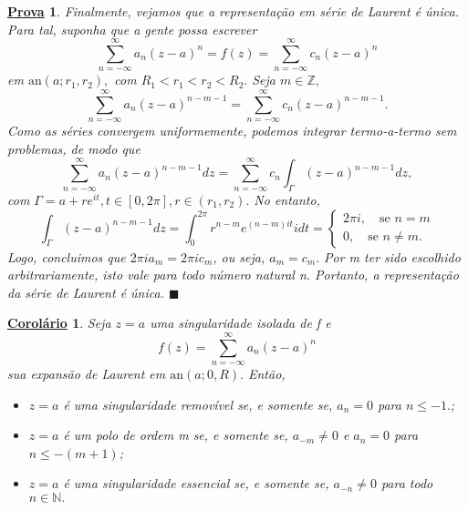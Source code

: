 \documentclass{article}
\newtheorem*{proof*}{\underline{Prova}}
\newtheorem*{crl*}{\underline{Corol\'ario}}
\renewcommand\qedsymbol{$\blacksquare$}
\begin{document}
\begin{proof*}
  Finalmente, vejamos que a representação em série de Laurent é única. Para tal, suponha que a gente possa escrever 
    \[
      \sum\limits_{n=-\infty}^{\infty}a_{n}(z-a)^{n} = f(z) = \sum\limits_{n=-\infty}^{\infty}c_{n}(z-a)^{n}
    \]
    em \(\mathrm{an}(a; r_{1}, r_{2}),\) com \(R_{1} < r_{1} < r_{2} < R_{2}.\) Seja \(m\in \mathbb{Z},\)
      \[
        \sum\limits_{n=-\infty}^{\infty}a_{n}(z-a)^{n-m-1} = \sum\limits_{n=-\infty}^{\infty}c_{n}(z-a)^{n-m-1}.
      \]
  Como as séries convergem uniformemente, podemos integrar termo-a-termo sem problemas, de modo que 
    \[
      \sum\limits_{n=-\infty}^{\infty}a_{n}(z-a)^{n-m-1}dz = \sum\limits_{n=-\infty}^{\infty}c_{n}\int_{\Gamma }^{}(z-a)^{n-m-1}dz,
    \]
  com \(\Gamma = a + r e^{it}, t\in [0, 2\pi ], r\in (r_{1}, r_{2}).\) No entanto, 
    \[
      \int_{\Gamma }^{}(z-a)^{n-m-1}dz = \int_{0}^{2\pi }r^{n-m}e^{(n-m)it}idt  = \left\{\begin{array}{ll}
          2\pi i,\quad \text{se } n =m\\
          0,\quad \text{se } n\neq m.
        \end{array}\right.
    \]
    Logo, concluimos que \(2\pi i a_{m} = 2\pi i c_{m}\), ou seja, \(a_{m}=c_{m}.\) Por m ter sido escolhido arbitrariamente,
isto vale para todo número natural n. Portanto, a representação da série de Laurent é única. \qedsymbol
  \end{proof*}
  \begin{crl*}
  Seja \(z=a\) uma singularidade isolada de f e 
    \[
      f(z) = \sum\limits_{n=-\infty}^{\infty}a_{n}(z-a)^{n}
    \] 
  sua expansão de Laurent em \(\mathrm{an}(a; 0, R).\) Então,
  \begin{itemize}
    \item[a)] \(z=a\) é uma singularidade removível se, e somente se, \(a_{n} = 0\) para \(n\leq -1.\);
    \item[b)] \(z=a\) é um polo de ordem m se, e somente se, \(a_{-m}\neq0\) e \(a_{n}=0\) para \(n\leq -(m+1)\);
    \item[c)] \(z=a\) é uma singularidade essencial se, e somente se, \(a_{-n}\neq0\) para todo \(n\in \mathbb{N}.\)
  \end{itemize}
  \end{crl*}
\end{document}
